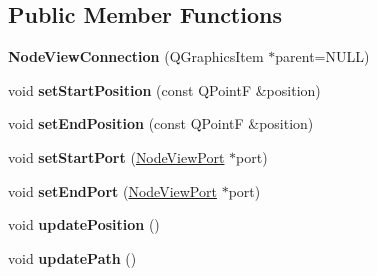 \subsection*{Public Member Functions}
\begin{DoxyCompactItemize}
\item 
\mbox{\label{classrev_1_1_view_1_1_node_view_connection_abcc24e301adc9d2584b8c896aef74149}} 
{\bfseries Node\+View\+Connection} (Q\+Graphics\+Item $\ast$parent=N\+U\+LL)
\item 
\mbox{\label{classrev_1_1_view_1_1_node_view_connection_a4395e3316e8a9e65b710a82fd62c860a}} 
void {\bfseries set\+Start\+Position} (const Q\+PointF \&position)
\item 
\mbox{\label{classrev_1_1_view_1_1_node_view_connection_a0481d1ce6ef27ebd6c58915edb8cf1a0}} 
void {\bfseries set\+End\+Position} (const Q\+PointF \&position)
\item 
\mbox{\label{classrev_1_1_view_1_1_node_view_connection_afbacd5c44f157f18d043fed0b5f3b5e5}} 
void {\bfseries set\+Start\+Port} (\mbox{\hyperlink{classrev_1_1_view_1_1_node_view_port}{Node\+View\+Port}} $\ast$port)
\item 
\mbox{\label{classrev_1_1_view_1_1_node_view_connection_a57c6744281e4bbb78c2dbd0c7d5a6a0b}} 
void {\bfseries set\+End\+Port} (\mbox{\hyperlink{classrev_1_1_view_1_1_node_view_port}{Node\+View\+Port}} $\ast$port)
\item 
\mbox{\label{classrev_1_1_view_1_1_node_view_connection_a45792c63dbe3cfe69fbde0bcd9146be8}} 
void {\bfseries update\+Position} ()
\item 
\mbox{\label{classrev_1_1_view_1_1_node_view_connection_af001e95570081120c3a1903390f7f6aa}} 
void {\bfseries update\+Path} ()
\item 
\mbox{\label{classrev_1_1_view_1_1_node_view_connection_a7913d7f96c138058ffc81922df57390a}} 

\end{DoxyCompactItemize}
